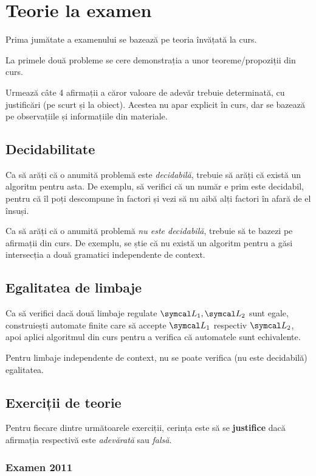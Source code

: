 \section*{Teorie la examen}

Prima jumătate a examenului se bazează pe teoria învățată la curs.

La primele două probleme se cere demonstrația a unor teoreme/propoziții din curs.

Urmează câte 4 afirmații a căror valoare de adevăr trebuie determinată, cu justificări (pe scurt și la obiect). Acestea nu apar explicit în curs, dar se bazează pe observațiile și informațiile din materiale.

\subsection*{Decidabilitate}

Ca să arăți că o anumită problemă este \emph{decidabilă}, trebuie să arăți că există un algoritm pentru asta. De exemplu, să verifici că un număr e prim este decidabil, pentru că îl poți descompune în factori și vezi să nu aibă alți factori în afară de el însuși.

Ca să arăți că o anumită problemă \emph{nu este decidabilă}, trebuie să te bazezi pe afirmații din curs. De exemplu, se știe că nu există un algoritm pentru a găsi intersecția a două gramatici independente de context.

\subsection*{Egalitatea de limbaje}

Ca să verifici dacă două limbaje regulate \(\limbaj_1, \limbaj_2\) sunt egale, construiești automate finite care să accepte \(\limbaj_1\) respectiv \(\limbaj_2\), apoi aplici algoritmul din curs pentru a verifica că automatele sunt echivalente.

Pentru limbaje independente de context, nu se poate verifica (nu este decidabilă) egalitatea.

\subsection*{Exerciții de teorie}

Pentru fiecare dintre următoarele exerciții, cerința este să se \textbf{justifice} dacă afirmația respectivă este \emph{adevărată} sau \emph{falsă}.

\subsubsection*{Examen 2011}


